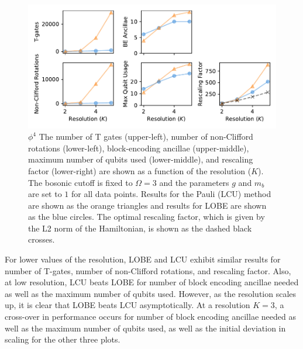 \begin{figure}
    \label{fig:phi4}
    \includegraphics[width = 16cm]{figures/phi4-resolution.pdf}
    \caption{
        \textbf{$\phi^4$}
        The number of T gates (upper-left), number of non-Clifford rotations (lower-left), block-encoding ancillae (upper-middle), maximum number of qubits used (lower-middle), and rescaling factor (lower-right) are shown as a function of the resolution ($K$).
        The bosonic cutoff is fixed to $\Omega = 3$ and the parameters $g$ and $m_b$ are set to $1$ for all data points.
        Results for the Pauli (LCU) method are shown as the orange triangles and results for LOBE are shown as the blue circles.
        The optimal rescaling factor, which is given by the L2 norm of the Hamiltonian, is shown as the dashed black crosses.
    }
\end{figure}

For lower values of the resolution, LOBE and LCU exhibit similar results for number of T-gates, number of non-Clifford rotations, and rescaling factor.
Also, at low resolution, LCU beats LOBE for number of block encoding ancillae needed as well as the maximum number of qubits used.
However, as the resolution scales up, it is clear that LOBE beats LCU asymptotically. 
At a resolution $K = 3$, a cross-over in performance occurs for number of block encoding ancillae needed as well as the maximum number of qubits used, as well as the initial deviation in scaling for the other three plots. 

